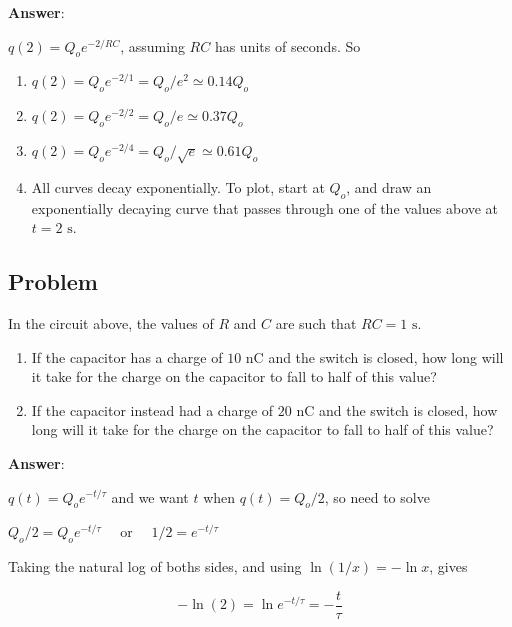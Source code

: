 \documentclass{article}
\begin{document}
\ifsolutions
\textbf{Answer}:

$q(2)=Q_oe^{-2/RC}$, assuming $RC$ has units of seconds. So

    \begin{enumerate}

      \item $q(2)=Q_oe^{-2/1}=Q_o/e^2 \simeq 0.14 Q_o$

      \item $q(2)=Q_oe^{-2/2}=Q_o/e \simeq 0.37 Q_o$

      \item $q(2)=Q_oe^{-2/4}=Q_o/\sqrt{e} \simeq 0.61 Q_o$

      \item All curves decay exponentially. To plot, start at $Q_o$, and draw an exponentially decaying curve that passes through one of the values above at $t=2\text{ s}$.

    \end{enumerate}
\fi

\subsection{Problem}



In the circuit above, the values of $R$ and $C$ are such that $RC=1\text{ s}$.

\begin{enumerate}

  \item If the capacitor has a charge of $10\text{ nC}$ and the switch is closed, how long will it take for the charge on the capacitor to fall to half of this value?

  \item If the capacitor instead had a charge of $20\text{ nC}$ and the switch is closed, how long will it take for the charge on the capacitor to fall to half of this value?

\end{enumerate}

\ifsolutions
\textbf{Answer}:

$q(t)=Q_oe^{-t/\tau}$ and we want $t$ when $q(t)=Q_o/2$, so need to solve 

$Q_o/2=Q_oe^{-t/\tau}\quad$ or $\quad 1/2=e^{-t/\tau}$

Taking the natural log of boths sides, and using $\ln(1/x)=-\ln x$, gives

\begin{equation}
-\ln(2) = \ln e^{-t/\tau} = -\frac{t}{\tau}
\end{equation}
\end{document}
